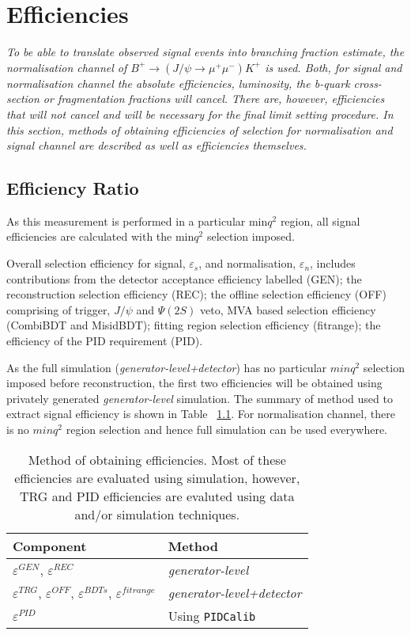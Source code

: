 \chapter{Efficiencies}

\textit{ To be able to translate observed signal events into branching fraction estimate,  the normalisation channel
of $B^{+} \rightarrow (J/\psi\rightarrow\mu^{+}\mu^{-})K^{+}$ is used. Both, for signal and normalisation
channel the absolute efficiencies, luminosity, the b-quark cross-section or fragmentation fractions will
cancel. There are, however, efficiencies that will not cancel and will be necessary for the final limit setting procedure. In this section, methods of obtaining efficiencies of selection for normalisation and signal channel are described as well as efficiencies themselves.}

\section{Efficiency Ratio}
\label{EfficiencyRatio}

As this measurement is performed in a particular min$q^{2}$ region, all signal efficiencies are calculated with the min$q^{2}$ selection imposed. 

Overall selection efficiency for signal, $\varepsilon_{s}$, and normalisation, $\varepsilon_{n}$, includes contributions from the detector acceptance efficiency labelled (GEN); the reconstruction selection efficiency (REC); the offline selection efficiency (OFF) comprising of trigger, $J/\psi$ and $\Psi(2S)$ veto, MVA based selection efficiency (CombiBDT and MisidBDT); fitting region selection efficiency (fitrange); the efficiency of the PID requirement (PID). 

As the full simulation (\textit{generator-level+detector}) has no particular $minq^2$ selection imposed before reconstruction, the first two efficiencies will be obtained using privately generated \textit{generator-level} simulation. The summary of method used to extract signal efficiency is shown in Table ~\ref{tab:signaleffsummary}. For normalisation channel, there is no $minq^2$ region selection and hence full simulation can be used everywhere.

\begin{table}[H]
\centering
\small
\hspace*{-0.5cm}\begin{tabular}{| l | l |}
\hline
Component & Method  \\ \hline
$\varepsilon^{GEN}$, $\varepsilon^{REC}$ & \textit{generator-level}   \\
$\varepsilon^{TRG}$, $\varepsilon^{OFF}$, $\varepsilon^{BDTs}$, $\varepsilon^{fitrange}$   & \textit{generator-level+detector} \\
$\varepsilon^{PID}$ & Using \texttt{PIDCalib} \\
\hline
 \end{tabular}
 \caption{Method of obtaining efficiencies. Most of these efficiencies are evaluated using simulation, however, TRG and PID efficiencies are evaluted using data and/or simulation techniques.}
\label{tab:signaleffsummary}
\end{table}

